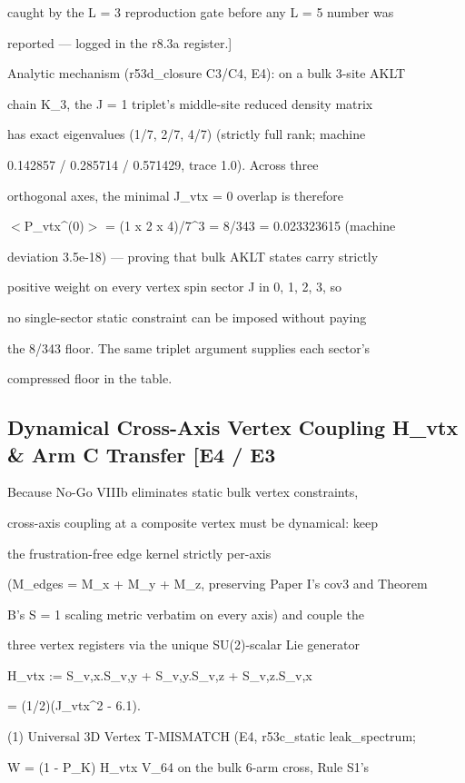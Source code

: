 \documentclass[11pt,a4paper]{article}
\theoremstyle{definition}
\begin{document}
caught by the L = 3 reproduction gate before any L = 5 number was

reported — logged in the r8.3a register.]


Analytic mechanism (r53d\_closure C3/C4, E4): on a bulk 3-site AKLT

chain K\_3, the J = 1 triplet's middle-site reduced density matrix

has exact eigenvalues (1/7, 2/7, 4/7) (strictly full rank; machine

0.142857 / 0.285714 / 0.571429, trace 1.0). Across three

orthogonal axes, the minimal J\_vtx = 0 overlap is therefore

$<$P\_vtx\^{}{(0)}$>$ = (1 x 2 x 4)/7\^{}3 = 8/343 = 0.023323615 (machine

deviation 3.5e-18) — proving that bulk AKLT states carry strictly

positive weight on every vertex spin sector J in {0, 1, 2, 3}, so

no single-sector static constraint can be imposed without paying

the 8/343 floor. The same triplet argument supplies each sector's

compressed floor in the table.


\subsection{Dynamical Cross-Axis Vertex Coupling H\_vtx \& Arm C Transfer [E4 / E3}

Because No-Go VIIIb eliminates static bulk vertex constraints,

cross-axis coupling at a composite vertex must be dynamical: keep

the frustration-free edge kernel strictly per-axis

(M\_edges = M\_x + M\_y + M\_z, preserving Paper I's cov3 and Theorem

B's S = 1 scaling metric verbatim on every axis) and couple the

three vertex registers via the unique SU(2)-scalar Lie generator


    H\_vtx := S\_{v,x}.S\_{v,y} + S\_{v,y}.S\_{v,z} + S\_{v,z}.S\_{v,x}

           = (1/2)(J\_vtx\^{}2 - 6.1).


(1) Universal 3D Vertex T-MISMATCH (E4, r53c\_static leak\_spectrum;

W = (1 - P\_K) H\_vtx V\_64 on the bulk 6-arm cross, Rule S1's
\end{document}
